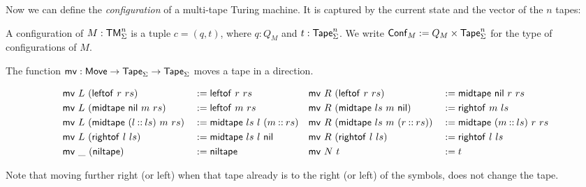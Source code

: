 
Now we can define the \emph{configuration} of a multi-tape Turing machine.  It is captured by the current state and the vector of the $n$ tapes:
\begin{definition}[Configuration][mconfig]
  \label{def:config}
  A configuration of $M: \mathsf{TM}_\Sigma^n$ is a tuple $c = (q, t)$, where $q: Q_M$ and $t: \mathsf{Tape}_\Sigma^n$.  We write
  $\mathsf{Conf}_M := Q_M \times \mathsf{Tape}_\Sigma^n$ for the type of configurations of $M$.
\end{definition}

The function $\mathsf{mv} : \mathsf{Move} \rightarrow \mathsf{Tape}_\Sigma \rightarrow \mathsf{Tape}_\Sigma$ moves a tape in a direction.
\begin{definition}
  \footnotesize
  \begin{alignat*}{4}
    & \mathsf{mv}~L~(\mathsf{leftof}~r~rs)                &&:= \mathsf{leftof}~r~rs
    && \mathsf{mv}~R~(\mathsf{leftof}~r~rs)               &&:= \mathsf{midtape}~\mathsf{nil}~r~rs \\
    & \mathsf{mv}~L~(\mathsf{midtape}~\mathsf{nil}~m~rs)          &&:= \mathsf{leftof}~m~rs
    && \mathsf{mv}~R~(\mathsf{midtape}~ls~m~\mathsf{nil})         &&:= \mathsf{rightof}~m~ls \\
    & \mathsf{mv}~L~(\mathsf{midtape}~(l \mathbin{::} ls)~m~rs)  &&:= \mathsf{midtape}~ls~l~(m \mathbin{::} rs)
    && \mathsf{mv}~R~(\mathsf{midtape}~ls~m~(r \mathbin{::} rs)) &&:= \mathsf{midtape}~(m \mathbin{::} ls)~r~rs \\
    & \mathsf{mv}~L~(\mathsf{rightof}~l~ls)               &&:= \mathsf{midtape}~ls~l~\mathsf{nil}
    && \mathsf{mv}~R~(\mathsf{rightof}~l~ls)              &&:= \mathsf{rightof}~l~ls \\
    & \mathsf{mv}~\_~(\mathsf{niltape})                   &&:= \mathsf{niltape}
    && \mathsf{mv}~N~t                                &&:= t
  \end{alignat*}
\end{definition}
Note that moving further right (or left) when that tape already is to the right (or left) of the symbols, does not change the tape.

